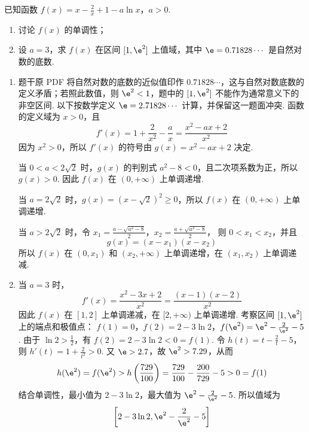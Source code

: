 \begin{problem}
已知函数 \(f(x) = x - \frac{2}{x} + 1 - a \ln x\)，\(a > 0\).
\begin{enumerate}
\item 讨论 \( f(x) \) 的单调性；
\item 设 \(a = 3\)，求 \(f(x)\) 在区间 \([1, \e^2]\) 上值域，其中 \(\e = 0.71828 \cdots\) 是自然对数的底数.
\end{enumerate}
\end{problem}

\begin{solution}
\begin{enumerate}
\item 题干原 PDF 将自然对数的底数的近似值印作 \(0.71828\cdots\)，这与自然对数底数的定义矛盾；若照此数值，则 \(\e^2<1\)，题中的 \([1,\e^2]\) 不能作为通常意义下的非空区间. 以下按数学定义 \(\e=2.71828\cdots\) 计算，并保留这一题面冲突. 函数的定义域为 \(x>0\)，且
\[
f'(x)=1+\frac{2}{x^2}-\frac{a}{x}
=\frac{x^2-ax+2}{x^2}
\]
因为 \(x^2>0\)，所以 \(f'(x)\) 的符号由 \(g(x)=x^2-ax+2\) 决定.

当 \(0<a<2\sqrt{2}\) 时，\(g(x)\) 的判别式 \(a^2-8<0\)，且二次项系数为正，所以 \(g(x)>0\). 因此 \(f(x)\) 在 \((0,+\infty)\) 上单调递增.

当 \(a=2\sqrt{2}\) 时，\(g(x)=(x-\sqrt{2})^2\geqslant0\)，所以 \(f(x)\) 在 \((0,+\infty)\) 上单调递增.

当 \(a>2\sqrt{2}\) 时，令
\(x_1=\frac{a-\sqrt{a^2-8}}{2}\)，\(x_2=\frac{a+\sqrt{a^2-8}}{2}\)，
则 \(0<x_1<x_2\)，并且
\[
g(x)=(x-x_1)(x-x_2)
\]
所以 \(f(x)\) 在 \((0,x_1)\) 和 \((x_2,+\infty)\) 上单调递增，在 \((x_1,x_2)\) 上单调递减.
\item 当 \(a=3\) 时，
\[
f'(x)=\frac{x^2-3x+2}{x^2}
=\frac{(x-1)(x-2)}{x^2}
\]
因此 \(f(x)\) 在 \([1,2]\) 上单调递减，在 \([2,+\infty)\) 上单调递增. 考察区间 \([1,\e^2]\) 上的端点和极值点：
\(f(1)=0\)，\(f(2)=2-3\ln2\)，\(f(\e^2)=\e^2-\frac{2}{\e^2}-5\).
由于 \(\ln2>\frac{1}{2}\)，有 \(f(2)=2-3\ln2<0=f(1)\). 令 \(h(t)=t-\frac{2}{t}-5\)，则 \(h'(t)=1+\frac{2}{t^2}>0\). 又 \(\e>2.7\)，故 \(\e^2>7.29\)，从而
\[
h(\e^2)=f(\e^2)>h\left(\frac{729}{100}\right)=\frac{729}{100}-\frac{200}{729}-5>0=f(1)
\]
结合单调性，最小值为 \(2-3\ln2\)，最大值为 \(\e^2-\frac{2}{\e^2}-5\). 所以值域为
\[
\left[2-3\ln2,\e^2-\frac{2}{\e^2}-5\right]
\]
\end{enumerate}
\end{solution}
